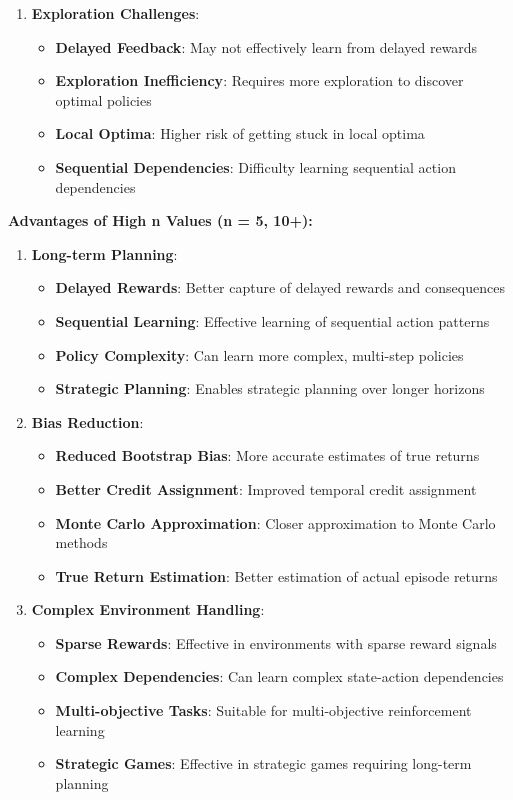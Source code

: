 \documentclass[12pt]{article}
\begin{document}
{{{\begin{enumerate}
    \item \textbf{Exploration Challenges}:
    \begin{itemize}
        \item \textbf{Delayed Feedback}: May not effectively learn from delayed rewards
        \item \textbf{Exploration Inefficiency}: Requires more exploration to discover optimal policies
        \item \textbf{Local Optima}: Higher risk of getting stuck in local optima
        \item \textbf{Sequential Dependencies}: Difficulty learning sequential action dependencies
    \end{itemize}
\end{enumerate}

\textbf{Advantages of High n Values (n = 5, 10+):}

\begin{enumerate}
    \item \textbf{Long-term Planning}:
    \begin{itemize}
        \item \textbf{Delayed Rewards}: Better capture of delayed rewards and consequences
        \item \textbf{Sequential Learning}: Effective learning of sequential action patterns
        \item \textbf{Policy Complexity}: Can learn more complex, multi-step policies
        \item \textbf{Strategic Planning}: Enables strategic planning over longer horizons
    \end{itemize}
    
    \item \textbf{Bias Reduction}:
    \begin{itemize}
        \item \textbf{Reduced Bootstrap Bias}: More accurate estimates of true returns
        \item \textbf{Better Credit Assignment}: Improved temporal credit assignment
        \item \textbf{Monte Carlo Approximation}: Closer approximation to Monte Carlo methods
        \item \textbf{True Return Estimation}: Better estimation of actual episode returns
    \end{itemize}
    
    \item \textbf{Complex Environment Handling}:
    \begin{itemize}
        \item \textbf{Sparse Rewards}: Effective in environments with sparse reward signals
        \item \textbf{Complex Dependencies}: Can learn complex state-action dependencies
        \item \textbf{Multi-objective Tasks}: Suitable for multi-objective reinforcement learning
        \item \textbf{Strategic Games}: Effective in strategic games requiring long-term planning
    \end{itemize}
    

\end{enumerate}}}}
\end{document}
